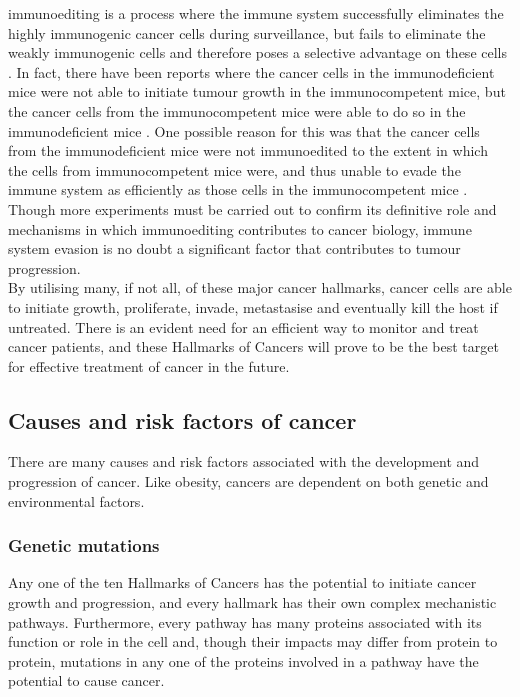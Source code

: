 \Gls{immunoediting} is a process where the immune system successfully eliminates the highly immunogenic cancer cells during surveillance, but fails to eliminate the weakly immunogenic cells and therefore poses a selective advantage on these cells \citep{Hanahan2011,Teng2008}.
In fact, there have been reports where the cancer cells in the immunodeficient mice were not able to initiate tumour growth in the immunocompetent mice, but the cancer cells from the immunocompetent mice were able to do so in the immunodeficient mice \citep{Hanahan2011}.
One possible reason for this was that the cancer cells from the immunodeficient mice were not immunoedited to the extent in which the cells from immunocompetent mice were, and thus unable to evade the immune system as efficiently as those cells in the immunocompetent mice \citep{Hanahan2011}.
Though more experiments must be carried out to confirm its definitive role and mechanisms in which immunoediting contributes to cancer biology, immune system evasion is no doubt a significant factor that contributes to tumour progression. \\

\noindent
By utilising many, if not all, of these major cancer hallmarks, cancer cells are able to initiate growth, proliferate, invade, metastasise and eventually kill the host if untreated.
There is an evident need for an efficient way to monitor and treat cancer patients, and these Hallmarks of Cancers will prove to be the best target for effective treatment of cancer in the future.

\subsection{Causes and risk factors of cancer}
\label{sub:causes_and_risk_factors_of_cancer}

There are many causes and risk factors associated with the development and progression of cancer.
Like obesity, cancers are dependent on both genetic and environmental factors.

\subsubsection{Genetic mutations}
\label{ssub:Genetic mutations}

Any one of the ten Hallmarks of Cancers has the potential to initiate cancer growth and progression, and every hallmark has their own complex mechanistic pathways.
Furthermore, every pathway has many proteins associated with its function or role in the cell and, though their impacts may differ from protein to protein, mutations in any one of the proteins involved in a pathway have the potential to cause cancer.

